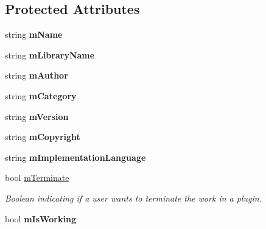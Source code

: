 \subsection*{Protected Attributes}
\begin{DoxyCompactItemize}
\item 
\hypertarget{classrrp_1_1_plugin_a1e458281effaffe16418036bea0ca965}{string {\bfseries m\-Name}}\label{classrrp_1_1_plugin_a1e458281effaffe16418036bea0ca965}

\item 
\hypertarget{classrrp_1_1_plugin_a3d2018b4eda57a195af8c1fea11b9b46}{string {\bfseries m\-Library\-Name}}\label{classrrp_1_1_plugin_a3d2018b4eda57a195af8c1fea11b9b46}

\item 
\hypertarget{classrrp_1_1_plugin_a4da57cedf87647ea3795296796263d1d}{string {\bfseries m\-Author}}\label{classrrp_1_1_plugin_a4da57cedf87647ea3795296796263d1d}

\item 
\hypertarget{classrrp_1_1_plugin_abd6ad2d9dbd41a6df6950459a387c024}{string {\bfseries m\-Category}}\label{classrrp_1_1_plugin_abd6ad2d9dbd41a6df6950459a387c024}

\item 
\hypertarget{classrrp_1_1_plugin_adb07778335f133209fcff5f9ee8f6253}{string {\bfseries m\-Version}}\label{classrrp_1_1_plugin_adb07778335f133209fcff5f9ee8f6253}

\item 
\hypertarget{classrrp_1_1_plugin_a52abb187ffe2d283f16c9b209d7d00a8}{string {\bfseries m\-Copyright}}\label{classrrp_1_1_plugin_a52abb187ffe2d283f16c9b209d7d00a8}

\item 
\hypertarget{classrrp_1_1_plugin_add0bce194f1dba2f41339ead75f72dee}{string {\bfseries m\-Implementation\-Language}}\label{classrrp_1_1_plugin_add0bce194f1dba2f41339ead75f72dee}

\item 
\hypertarget{classrrp_1_1_plugin_a7993b278e3345a27c3e01b2958b8ec12}{bool \hyperlink{classrrp_1_1_plugin_a7993b278e3345a27c3e01b2958b8ec12}{m\-Terminate}}\label{classrrp_1_1_plugin_a7993b278e3345a27c3e01b2958b8ec12}

\begin{DoxyCompactList}\small\item\em Boolean indicating if a user wants to terminate the work in a plugin. \end{DoxyCompactList}\item 
\hypertarget{classrrp_1_1_plugin_a529811b5703f95e5b011fa628892435a}{bool {\bfseries m\-Is\-Working}}\label{classrrp_1_1_plugin_a529811b5703f95e5b011fa628892435a}


\end{DoxyCompactItemize}
